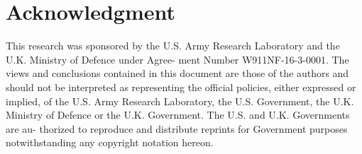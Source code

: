 \documentclass[conference]{IEEEtran}
\begin{document}
\section*{Acknowledgment}
This research was sponsored by the U.S. Army Research Laboratory and the U.K. Ministry of Defence under Agree- ment Number W911NF-16-3-0001. The views and conclusions contained in this document are those of the authors and should not be interpreted as representing the official policies, either expressed or implied, of the U.S. Army Research Laboratory, the U.S. Government, the U.K. Ministry of Defence or the U.K. Government. The U.S. and U.K. Governments are au- thorized to reproduce and distribute reprints for Government purposes notwithstanding any copyright notation hereon.


\end{document}
